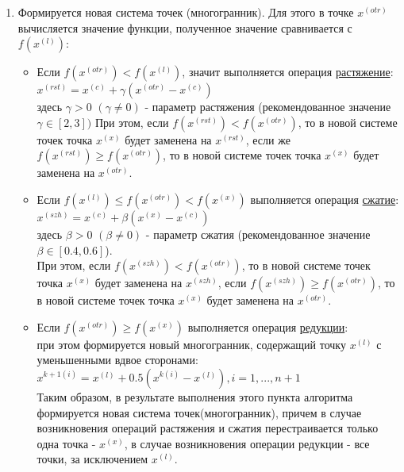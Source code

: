 \begin{itemize}
\begin{enumerate}
        \item Формируется новая система точек (многогранник). Для этого в точке $x^{(otr)}$ вычисляется значение функции, полученное значение сравнивается с $f(x^{(l)})$:
        \begin{itemize}
            \item Если $f(x^{(otr)}) < f(x^{(l)})$, значит выполняется операция \underline{растяжение}:\\

            $x^{(rst)} = x^{(c)} + \gamma(x^{(otr)} - x^{(c)})$\\

            здесь $\gamma > 0$ $(\gamma \neq 0)$ - параметр растяжения (рекомендованное значение $\gamma \in [2, 3])$
            При этом, если $f(x^{(rst)}) < f(x^{(otr)})$, то в новой системе точек точка $x^{(x)}$ будет заменена на $x^{(rst)}$, если же $f(x^{(rst)}) \geqslant f(x^{(otr)})$, то в новой системе точек точка $x^{(x)}$ будет заменена на $x^{(otr)}$.

            \item Если $f(x^{(l)}) \leqslant f(x^{(otr)}) < f(x^{(x)})$ выполняется операция \underline{сжатие}:\\

            $x^{(szh)} = x^{(c)} + \beta(x^{(x)} - x^{(c)})$\\

            здесь $\beta > 0$  $(\beta \neq 0)$ - параметр сжатия (рекомендованное значение $\beta \in [0.4, 0.6]$).\\

            При этом, если $f(x^{(szh)}) < f(x^{(otr)})$, то в новой системе точек точка $x^{(x)}$ будет заменена на $x^{(szh)}$, если $f(x^{(szh)}) \geqslant f(x^{(otr)})$, то в новой системе точек точка $x^{(x)}$ будет заменена на $x^{(otr)}$.

            \item Если $f(x^{(otr)}) \geqslant f(x^{(x)})$ выполняется операция \underline{редукции}:\\

            	при этом формируется новый многогранник, содержащий точку $x^{(l)}$ с уменьшенными вдвое сторонами: \\

            		$x^{k + 1(i)} = x^{(l)} + 0.5(x^{k(i)} - x^{(l)}), i = 1, ... , n + 1$\\

            Таким образом, в результате выполнения этого пункта алгоритма формируется новая система точек(многогранник), причем в случае возникновения операций растяжения и сжатия перестраивается только одна точка - $x^{(x)}$, в случае возникновения операции редукции - все точки, за исключением $x^{(l)}$.


\end{itemize}
\end{enumerate}
\end{itemize}
